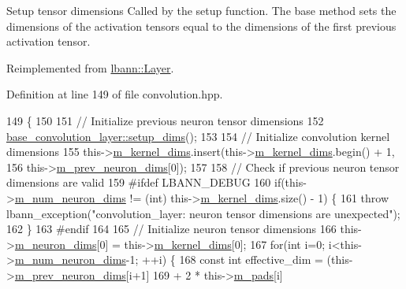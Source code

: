 Setup tensor dimensions Called by the setup function. The base method sets the dimensions of the activation tensors equal to the dimensions of the first previous activation tensor. 

Reimplemented from \hyperlink{classlbann_1_1Layer_a90fce1b06c1f2abb480e18cfe08a9746}{lbann\+::\+Layer}.



Definition at line 149 of file convolution.\+hpp.


\begin{DoxyCode}
149                              \{
150 
151     \textcolor{comment}{// Initialize previous neuron tensor dimensions}
152     \hyperlink{classlbann_1_1Layer_a90fce1b06c1f2abb480e18cfe08a9746}{base\_convolution\_layer::setup\_dims}();
153 
154     \textcolor{comment}{// Initialize convolution kernel dimensions}
155     this->\hyperlink{classlbann_1_1base__convolution__layer_a283edb6a476f975e713d0b4235ac658f}{m\_kernel\_dims}.insert(this->\hyperlink{classlbann_1_1base__convolution__layer_a283edb6a476f975e713d0b4235ac658f}{m\_kernel\_dims}.begin() + 1,
156                                this->\hyperlink{classlbann_1_1Layer_ae204d1a2a79606eaa117273857ff62a3}{m\_prev\_neuron\_dims}[0]);
157 
158     \textcolor{comment}{// Check if previous neuron tensor dimensions are valid}
159 \textcolor{preprocessor}{  #ifdef LBANN\_DEBUG}
160     \textcolor{keywordflow}{if}(this->\hyperlink{classlbann_1_1Layer_adfd6178d21498c9095cd947ae1eb2d6a}{m\_num\_neuron\_dims} != (\textcolor{keywordtype}{int}) this->\hyperlink{classlbann_1_1base__convolution__layer_a283edb6a476f975e713d0b4235ac658f}{m\_kernel\_dims}.size() - 1) \{
161       \textcolor{keywordflow}{throw} lbann\_exception(\textcolor{stringliteral}{"convolution\_layer: neuron tensor dimensions are unexpected"});
162     \}
163 \textcolor{preprocessor}{  #endif}
164 
165     \textcolor{comment}{// Initialize neuron tensor dimensions}
166     this->\hyperlink{classlbann_1_1Layer_abb34bb8031f57a483e2e327a5f229f48}{m\_neuron\_dims}[0] = this->\hyperlink{classlbann_1_1base__convolution__layer_a283edb6a476f975e713d0b4235ac658f}{m\_kernel\_dims}[0];
167     \textcolor{keywordflow}{for}(\textcolor{keywordtype}{int} i=0; i<this->\hyperlink{classlbann_1_1Layer_adfd6178d21498c9095cd947ae1eb2d6a}{m\_num\_neuron\_dims}-1; ++i) \{
168       \textcolor{keyword}{const} \textcolor{keywordtype}{int} effective\_dim = (this->\hyperlink{classlbann_1_1Layer_ae204d1a2a79606eaa117273857ff62a3}{m\_prev\_neuron\_dims}[i+1]
169                                  + 2 * this->\hyperlink{classlbann_1_1base__convolution__layer_a9732a8a0170a413bf0cde0128ad2a571}{m\_pads}[i]

\end{DoxyCode}
